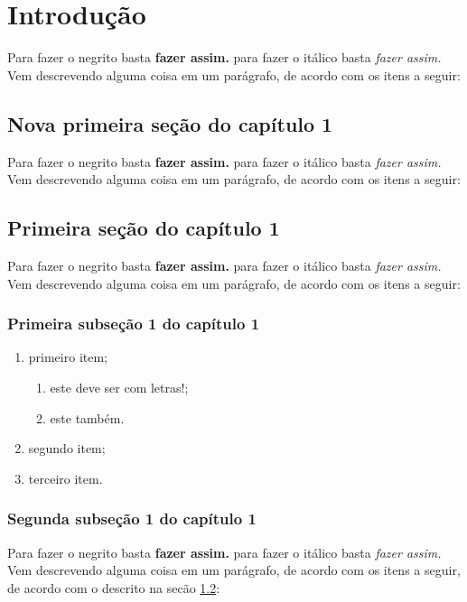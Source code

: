 \chapter{Introdução}
Para fazer o negrito basta \textbf{fazer assim.} para fazer o itálico basta \textit{fazer assim.} Vem descrevendo alguma coisa em um parágrafo, de acordo com os itens a seguir:

\section{Nova primeira seção do capítulo 1}

Para fazer o negrito basta \textbf{fazer assim.} para fazer o itálico basta \textit{fazer assim.} Vem descrevendo alguma coisa em um parágrafo, de acordo com os itens a seguir:

\section{Primeira seção do capítulo 1}\label{primeira-secao}

Para fazer o negrito basta \textbf{fazer assim.} para fazer o itálico basta \textit{fazer assim.} Vem descrevendo alguma coisa em um parágrafo, de acordo com os itens a seguir:

\subsection{Primeira subseção 1 do capítulo 1}

\begin{enumerate}
    \item primeiro item;
    \begin{enumerate}
        \item este deve ser com letras!;
        \item este também.
    \end{enumerate}
    \item segundo item;
    \item terceiro item.
\end{enumerate}

\subsection{Segunda subseção 1 do capítulo 1}
Para fazer o negrito basta \textbf{fazer assim.} para fazer o itálico basta \textit{fazer assim.} Vem descrevendo alguma coisa em um parágrafo, de acordo com os itens a seguir, de acordo com o descrito na secão \ref{primeira-secao}:
